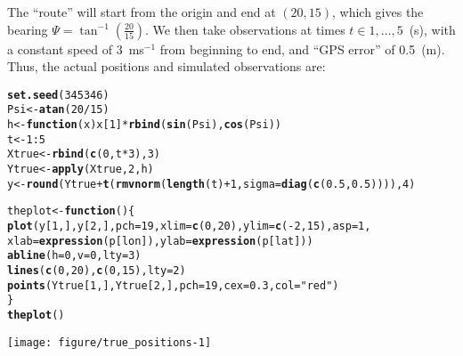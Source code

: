 \documentclass[11pt]{article}\usepackage[]{graphicx}\usepackage[]{color}
\makeatletter
\def\maxwidth{ %
  \ifdim\Gin@nat@width>\linewidth
    \linewidth
  \else
    \Gin@nat@width
  \fi
}
\newcommand{\hlnum}[1]{\textcolor[rgb]{0.686,0.059,0.569}{#1}}%
\newcommand{\hlstr}[1]{\textcolor[rgb]{0.192,0.494,0.8}{#1}}%
\newcommand{\hlopt}[1]{\textcolor[rgb]{0,0,0}{#1}}%
\newcommand{\hlstd}[1]{\textcolor[rgb]{0.345,0.345,0.345}{#1}}%
\newcommand{\hlkwa}[1]{\textcolor[rgb]{0.161,0.373,0.58}{\textbf{#1}}}%
\newcommand{\hlkwb}[1]{\textcolor[rgb]{0.69,0.353,0.396}{#1}}%
\newcommand{\hlkwc}[1]{\textcolor[rgb]{0.333,0.667,0.333}{#1}}%
\newcommand{\hlkwd}[1]{\textcolor[rgb]{0.737,0.353,0.396}{\textbf{#1}}}%
\newenvironment{kframe}{%
 \def\at@end@of@kframe{}%
 \ifinner\ifhmode%
  \def\at@end@of@kframe{\end{minipage}}%
  \begin{minipage}{\columnwidth}%
 \fi\fi%
 \def\FrameCommand##1{\hskip\@totalleftmargin \hskip-\fboxsep
 \colorbox{shadecolor}{##1}\hskip-\fboxsep
     \hskip-\linewidth \hskip-\@totalleftmargin \hskip\columnwidth}%
 \MakeFramed {\advance\hsize-\width
   \@totalleftmargin\z@ \linewidth\hsize
   \@setminipage}}%
 {\par\unskip\endMakeFramed%
 \at@end@of@kframe}
\newenvironment{knitrout}{}{} %
\makeatother
\begin{document}
The ``route'' will start from the origin and end at $\left(20, 15\right)$,
which gives the bearing $\Psi = \tan^{-1}\left(\frac{20}{15}\right)$. 
We then take observations at times $t \in 1, \ldots, 5$~(s), with a constant speed of 3~ms$^{-1}$ from beginning to
end, and ``GPS error'' of 0.5~(m). Thus, the actual positions and simulated observations are:
\begin{knitrout}
\color{fgcolor}\begin{kframe}
\begin{alltt}
\hlkwd{set.seed}\hlstd{(}\hlnum{345346}\hlstd{)}
\hlstd{Psi} \hlkwb{<-} \hlkwd{atan}\hlstd{(}\hlnum{20}\hlopt{/}\hlnum{15}\hlstd{)}
\hlstd{h} \hlkwb{<-} \hlkwa{function}\hlstd{(}\hlkwc{x}\hlstd{) x[}\hlnum{1}\hlstd{]} \hlopt{*} \hlkwd{rbind}\hlstd{(}\hlkwd{sin}\hlstd{(Psi),} \hlkwd{cos}\hlstd{(Psi))}
\hlstd{t} \hlkwb{<-} \hlnum{1}\hlopt{:}\hlnum{5}
\hlstd{Xtrue} \hlkwb{<-} \hlkwd{rbind}\hlstd{(}\hlkwd{c}\hlstd{(}\hlnum{0}\hlstd{, t} \hlopt{*} \hlnum{3}\hlstd{),} \hlnum{3}\hlstd{)}
\hlstd{Ytrue} \hlkwb{<-} \hlkwd{apply}\hlstd{(Xtrue,} \hlnum{2}\hlstd{, h)}
\hlstd{y} \hlkwb{<-} \hlkwd{round}\hlstd{(Ytrue} \hlopt{+} \hlkwd{t}\hlstd{(}\hlkwd{rmvnorm}\hlstd{(}\hlkwd{length}\hlstd{(t)} \hlopt{+} \hlnum{1}\hlstd{,} \hlkwc{sigma} \hlstd{=} \hlkwd{diag}\hlstd{(}\hlkwd{c}\hlstd{(}\hlnum{0.5}\hlstd{,} \hlnum{0.5}\hlstd{)))),} \hlnum{4}\hlstd{)}

\hlstd{theplot} \hlkwb{<-} \hlkwa{function}\hlstd{() \{}
    \hlkwd{plot}\hlstd{(y[}\hlnum{1}\hlstd{, ], y[}\hlnum{2}\hlstd{, ],} \hlkwc{pch} \hlstd{=} \hlnum{19}\hlstd{,} \hlkwc{xlim} \hlstd{=} \hlkwd{c}\hlstd{(}\hlnum{0}\hlstd{,} \hlnum{20}\hlstd{),} \hlkwc{ylim} \hlstd{=} \hlkwd{c}\hlstd{(}\hlopt{-}\hlnum{2}\hlstd{,} \hlnum{15}\hlstd{),} \hlkwc{asp} \hlstd{=} \hlnum{1}\hlstd{,}
         \hlkwc{xlab} \hlstd{=} \hlkwd{expression}\hlstd{(p[lon]),} \hlkwc{ylab} \hlstd{=} \hlkwd{expression}\hlstd{(p[lat]))}
    \hlkwd{abline}\hlstd{(}\hlkwc{h} \hlstd{=} \hlnum{0}\hlstd{,} \hlkwc{v} \hlstd{=} \hlnum{0}\hlstd{,} \hlkwc{lty} \hlstd{=} \hlnum{3}\hlstd{)}
    \hlkwd{lines}\hlstd{(}\hlkwd{c}\hlstd{(}\hlnum{0}\hlstd{,} \hlnum{20}\hlstd{),} \hlkwd{c}\hlstd{(}\hlnum{0}\hlstd{,} \hlnum{15}\hlstd{),} \hlkwc{lty} \hlstd{=} \hlnum{2}\hlstd{)}
    \hlkwd{points}\hlstd{(Ytrue[}\hlnum{1}\hlstd{, ], Ytrue[}\hlnum{2}\hlstd{, ],} \hlkwc{pch} \hlstd{=} \hlnum{19}\hlstd{,} \hlkwc{cex} \hlstd{=} \hlnum{0.3}\hlstd{,} \hlkwc{col} \hlstd{=} \hlstr{"red"}\hlstd{)}
\hlstd{\}}
\hlkwd{theplot}\hlstd{()}
\end{alltt}
\end{kframe}

{\centering \texttt{[image: figure/true\_positions-1]} 

}



\end{knitrout}
\end{document}
